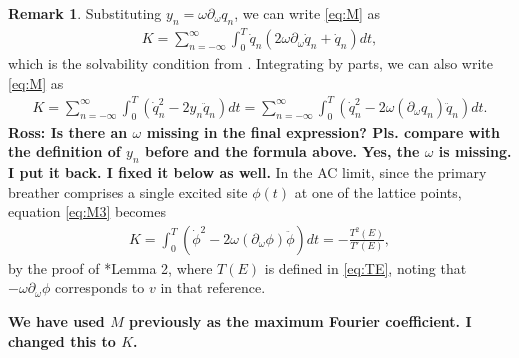 \documentclass[12pt,reqno]{amsart}
\theoremstyle{definition}
\newtheorem{remark}{Remark}
\begin{document}
\begin{remark}\label{remark:solvability}
Substituting $y_n = \omega \partial_\omega q_n$, we can write \cref{eq:M} as 
\begin{align}\label{eq:M2}
K =
\sum_{n = -\infty}^\infty \int_0^T \dot{q}_n \left( 2 \omega \partial_\omega \dot{q}_n + \dot{q}_n \right) dt,
\end{align}
which is the solvability condition from \cite{kevrekidis2016}. Integrating by parts, we can also write \cref{eq:M} as 
\begin{align}\label{eq:M3}
K =
\sum_{n = -\infty}^\infty \int_0^T \left( \dot{q}_n^2 - 2 y_n \ddot{q}_n \right) dt =
\sum_{n = -\infty}^\infty \int_0^T \left( \dot{q}_n^2 - 2 \omega (\partial_\omega q_n) \ddot{q}_n \right) dt.
\end{align}
{\bf Ross: Is there an $\omega$ missing in the final expression? Pls.
compare with the definition of $y_n$ before and the formula above. Yes, the $\omega$ is missing. I put it back. I fixed it below as well.}
In the AC limit, since the primary breather comprises a single excited site $\phi(t)$ at one of the lattice points, equation \cref{eq:M3} becomes
\begin{align}\label{eq:MAC}
K = \int_0^T \left( \dot{\phi}^2 - 2 \omega(\partial_\omega \phi) \ddot{\phi} \right) dt = - \frac{T^2(E)}{T'(E)},
\end{align}
by the proof of \cite{Pelinovsky2012}*{Lemma 2}, where $T(E)$ is defined in \cref{eq:TE}, noting that $-\omega \partial_\omega \phi$ corresponds to $v$ in that reference.
\end{remark}

{\bf We have used $M$ previously as the maximum Fourier coefficient. I changed this to $K$.}
\end{document}
